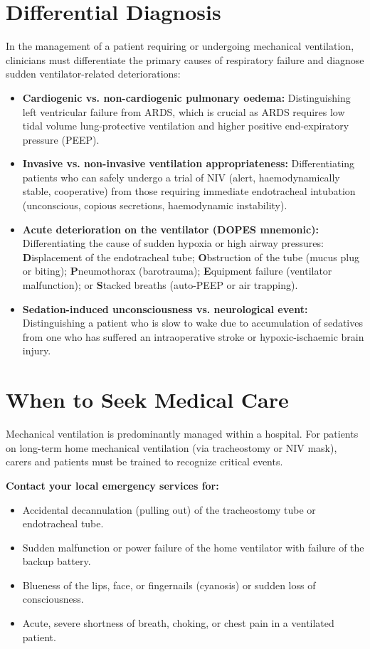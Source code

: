 \section*{Differential Diagnosis}
In the management of a patient requiring or undergoing mechanical ventilation, clinicians must differentiate the primary causes of respiratory failure and diagnose sudden ventilator-related deteriorations:
\begin{itemize}
    \item \textbf{Cardiogenic vs. non-cardiogenic pulmonary oedema:} Distinguishing left ventricular failure from ARDS, which is crucial as ARDS requires low tidal volume lung-protective ventilation and higher positive end-expiratory pressure (PEEP).
    \item \textbf{Invasive vs. non-invasive ventilation appropriateness:} Differentiating patients who can safely undergo a trial of NIV (alert, haemodynamically stable, cooperative) from those requiring immediate endotracheal intubation (unconscious, copious secretions, haemodynamic instability).
    \item \textbf{Acute deterioration on the ventilator (DOPES mnemonic):} Differentiating the cause of sudden hypoxia or high airway pressures: \textbf{D}isplacement of the endotracheal tube; \textbf{O}bstruction of the tube (mucus plug or biting); \textbf{P}neumothorax (barotrauma); \textbf{E}quipment failure (ventilator malfunction); or \textbf{S}tacked breaths (auto-PEEP or air trapping).
    \item \textbf{Sedation-induced unconsciousness vs. neurological event:} Distinguishing a patient who is slow to wake due to accumulation of sedatives from one who has suffered an intraoperative stroke or hypoxic-ischaemic brain injury.
\end{itemize}

\section*{When to Seek Medical Care}
Mechanical ventilation is predominantly managed within a hospital. For patients on long-term home mechanical ventilation (via tracheostomy or NIV mask), carers and patients must be trained to recognize critical events.

\textbf{Contact your local emergency services for:}
\begin{itemize}
    \item Accidental decannulation (pulling out) of the tracheostomy tube or endotracheal tube.
    \item Sudden malfunction or power failure of the home ventilator with failure of the backup battery.
    \item Blueness of the lips, face, or fingernails (cyanosis) or sudden loss of consciousness.
    \item Acute, severe shortness of breath, choking, or chest pain in a ventilated patient.
\end{itemize}

